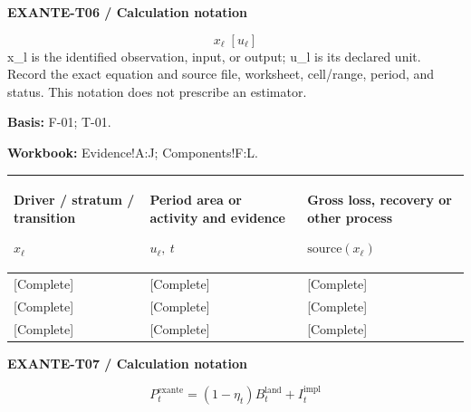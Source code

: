 \textbf{EXANTE-T06 / Calculation notation}\par
{\fontsize{9}{11}\selectfont\[ x_{\ell}\;[u_{\ell}] \]}
x\_l is the identified observation, input, or output; u\_l is its declared unit. Record the exact equation and source file, worksheet, cell/range, period, and status. This notation does not prescribe an estimator.\par
\textbf{Basis:} F-01; T-01.\par
\textbf{Workbook:} Evidence!A:J; Components!F:L.\par\endgroup
{\sffamily\fontsize{8.3}{10.3}\selectfont\begin{longtable}{@{}P{54.83mm} P{54.83mm} P{54.83mm}@{}}
\toprule
\textbf{Driver / stratum / transition}\par {\normalfont\fontsize{8.2}{10}\selectfont $x_{\ell}$} & \textbf{Period area or activity and evidence}\par {\normalfont\fontsize{8.2}{10}\selectfont $u_{\ell},\ t$} & \textbf{Gross loss, recovery or other process}\par {\normalfont\fontsize{8.2}{10}\selectfont $\text{source}(x_{\ell})$}\\\midrule\endhead
\rule{0pt}{8mm}[Complete] & [Complete] & [Complete]\\\hline
\rule{0pt}{8mm}[Complete] & [Complete] & [Complete]\\\hline
\rule{0pt}{8mm}[Complete] & [Complete] & [Complete]\\\hline
\end{longtable}}
\par\begingroup\sffamily\fontsize{8}{10}\selectfont\color{NEBGreen}\setlength{\parskip}{2pt}\setlength{\abovedisplayskip}{4pt}\setlength{\belowdisplayskip}{4pt}\setlength{\abovedisplayshortskip}{2pt}\setlength{\belowdisplayshortskip}{3pt}
\textbf{EXANTE-T07 / Calculation notation}\par
{\fontsize{9}{11}\selectfont\[ P_t^{\mathrm{exante}}=(1-\eta_t)B_t^{\mathrm{land}}+I_t^{\mathrm{impl}} \]}
